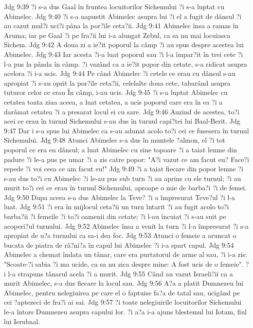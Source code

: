 Jdg 9:39  ?i s-a dus Gaal în fruntea locuitorilor Sichemului ?i s-a luptat cu Abimelec.
Jdg 9:40  ?i s-a napustit Abimelec asupra lui ?i el a fugit de dânsul ?i au cazut mul?i uci?i pâna la por?ile ceta?ii.
Jdg 9:41  Abimelec însa a ramas în Aruma; iar pe Gaal ?i pe fra?ii lui i-a alungat Zebul, ca sa nu mai locuiasca Sichem.
Jdg 9:42  A doua zi a ie?it poporul la câmp ?i au spus despre acestea lui Abimelec.
Jdg 9:43  Iar acesta ?i-a luat poporul sau ?i l-a împar?it în trei cete ?i l-a pus la pânda în câmp. ?i vazând ca a ie?it popor din cetate, s-a ridicat asupra acelora ?i i-a ucis.
Jdg 9:44  Pe când Abimelec ?i cetele ce erau cu dânsul s-au apropiat ?i s-au oprit la por?ile ceta?ii, celelalte doua cete, tabarând asupra tuturor celor ce erau În câmp, i-au ucis.
Jdg 9:45  ?i s-a luptat Abimelec cu cetatea toata ziua aceea, a luat cetatea, a ucis poporul care era în ea ?i a darâmat cetatea ?i a presarat locul ei cu sare.
Jdg 9:46  Auzind de acestea, to?i acei ce erau în turnul Sichemului s-au dus în turnul capi?tei lui Baal-Berit.
Jdg 9:47  Dar i s-a spus lui Abimelec ca s-au adunat acolo to?i cei ce fusesera în turnul Sichemului.
Jdg 9:48  Atunci Abimelec s-a dus în muntele ?almon, el ?i tot poporul ce era eu dânsul; a luat Abimelec cu sine topoare ?i a taiat lemne din padure ?i le-a pus pe umar ?i a zis catre popor: "A?i vazut ce am facut eu? Face?i repede ?i voi ceea ce am facut eu!"
Jdg 9:49  ?i a taiat fiecare din popor lemne ?i s-au dus to?i cu Abimelec ?i le-au pus sub turn ?i au aprins cu ele turnul; ?i au murit to?i cei ce erau în turnul Sichemului, aproape o mie de barba?i ?i de femei.
Jdg 9:50  Dupa aceea s-a dus Abimelec la Teve? ?i a împresurat Teve?ul ?i l-a luat.
Jdg 9:51  ?i era în mijlocul ceta?ii un turn întarit ?i au fugit acolo to?i barba?ii ?i femeile ?i to?i oamenii din cetate; ?i l-au încuiat ?i s-au suit pe acoperi?ul turnului.
Jdg 9:52  Abimelec însa a venit la turn ?i l-a împresurat ?i s-a apropiat de u?a turnului ca sa-i dea foc.
Jdg 9:53  Atunci o femeie a aruncat o bucata de piatra de râ?ni?a în capul lui Abimelec ?i i-a spart capul.
Jdg 9:54  Abimelec a chemat îndata un tânar, care era purtatorul de arme al sau, ?i i-a zis: "Scoate-?i sabia ?i ma ucide, ca sa nu zica despre mine: A fost ucis de o femeie". ?i l-a strapuns tânarul acela ?i a murit.
Jdg 9:55  Când au vazut Israeli?ii ca a murit Abimelec, s-a dus fiecare la locul sau.
Jdg 9:56  A?a a platit Dumnezeu lui Abimelec, pentru nelegiuirea pe care el o faptuise fa?a de tatal sau, ucigând pe cei ?aptezeci de fra?i ai sai.
Jdg 9:57  ?i toate nelegiuirile locuitorilor Sichemului le-a întors Dumnezeu asupra capului lor. ?i a?a i-a ajuns blestemul lui Iotam, fiul lui Ierubaal.

